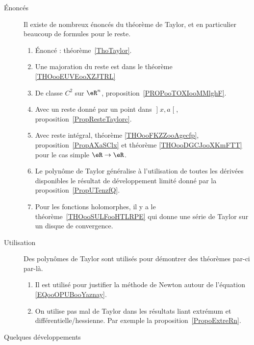 
\begin{description}
	\item[Énoncés]

		Il existe de nombreux énoncés du théorème de Taylor, et en particulier beaucoup de formules pour le reste.

		\begin{enumerate}
			\item
			      Énoncé : théorème~\ref{ThoTaylor}.
			\item
			      Une majoration du reste est dans le théorème \ref{THOooEUVEooXZJTRL}
			\item
			      De classe \( C^2\) sur \( \eR^n\), proposition~\ref{PROPooTOXIooMMlghF}.
			\item
			      Avec un reste donné par un point dans \( \mathopen] x , a \mathclose[\), proposition~\ref{PropResteTaylorc}.
			\item
			      Avec reste intégral, théorème \ref{THOooFKZZooAgecfp}, proposition~\ref{PropAXaSClx} et théorème \ref{THOooDGCJooXKmFTT} pour le cas simple \( \eR\to \eR\).
			\item
			      Le polynôme de Taylor généralise à l'utilisation de toutes les dérivées disponibles le résultat de développement limité donné par la proposition~\ref{PropUTenzfQ}.
			\item
			      Pour les fonctions holomorphes, il y a le théorème~\ref{THOooSULFooHTLRPE} qui donne une série de Taylor sur un disque de convergence.
		\end{enumerate}

	\item[Utilisation]

		Des polynômes de Taylor sont utilisés pour démontrer des théorèmes par-ci par-là.

		\begin{enumerate}
			\item
			      Il est utilisé pour justifier la méthode de Newton autour de l'équation \eqref{EQooOPUBooYaznay}.
			\item
			      On utilise pas mal de Taylor dans les résultats liant extrémum et différentielle/hessienne. Par exemple la proposition~\ref{PropoExtreRn}.
		\end{enumerate}

	\item[Quelques développements]


\end{description}
